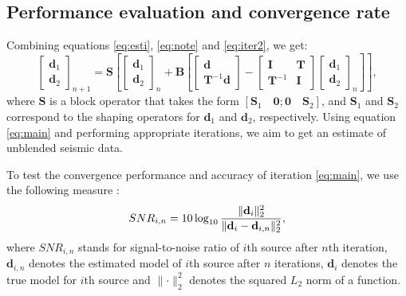 \subsection{Performance evaluation and convergence rate}
Combining equations \ref{eq:esti}, \ref{eq:note} and \ref{eq:iter2}, we get: 
\begin{equation}
\label{eq:main}
\left[\begin{array}{cc}
\mathbf{d}_1\\
\mathbf{d}_2
\end{array}\right]_{n+1}=\mathbf{S}
\left[
\left[\begin{array}{cc}
\mathbf{d}_1\\
\mathbf{d}_2
\end{array}\right]_n+
\mathbf{B}\left[\left[\begin{array}{cc}
\mathbf{d}\\
\mathbf{T}^{-1}\mathbf{d}
\end{array}\right]-\left[\begin{array}{cc}
\mathbf{I}	& \mathbf{T}\\
\mathbf{T}^{-1} & \mathbf{I}
\end{array}\right]
\left[\begin{array}{cc}
\mathbf{d}_1\\
\mathbf{d}_2
\end{array}\right]_n
\right]\right],
\end{equation}
where $\mathbf{S}$ is a block operator that takes the form
$[\mathbf{S}_1\quad \mathbf{0};\mathbf{0}\quad\mathbf{S}_2]$, and $\mathbf{S}_1$ and $\mathbf{S}_2$ correspond to the shaping operators for $\mathbf{d}_1$ and $\mathbf{d}_2$, respectively. Using equation \ref{eq:main} and performing appropriate iterations, we aim to get an estimate of unblended seismic data.

To test the convergence performance and accuracy of iteration \ref{eq:main}, we use the following measure \cite[]{hennenfent2006}:
\begin{equation}
\label{eq:diff}
SNR_{i,n}=10\log_{10}\frac{\Arrowvert \mathbf{d}_i \Arrowvert_2^2}{\Arrowvert \mathbf{d}_i-\mathbf{d}_{i,n}\Arrowvert_2^2},
\end{equation}
where $SNR_{i,n}$ stands for signal-to-noise ratio of $i$th source after $n$th iteration, $\mathbf{d}_{i,n}$ denotes the estimated model of $i$th source after $n$ iterations, $\mathbf{d}_i$ denotes the true model for $i$th source and $\parallel \cdot \parallel_2^2$ denotes the squared $L_2$ norm of a function.

